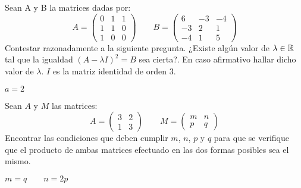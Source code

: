 \begin{ejer}
Sean A y B la matrices dadas por:
\[A=\begin{pmatrix}
0 & 1 & 1 \\
1 & 1 & 0 \\
1 & 0 & 0
\end{pmatrix}
\qquad
B=\begin{pmatrix}
6 & -3 & -4 \\
-3 & 2 & 1 \\
-4 & 1 & 5
\end{pmatrix} \]
Contestar razonadamente a la siguiente pregunta. ¿Existe algún valor de $\lambda \in \mathbb{R}$ tal que la igualdad $(A-\lambda I)^2=B$ sea cierta?. En caso afirmativo hallar dicho valor de $\lambda $. $I$ es la matriz identidad de orden 3. 
\begin{solu}
$a=2$
\end{solu}
\end{ejer}

\begin{ejer}
 Sean $A$ y $M$ las matrices:
\[ A=\begin{pmatrix}
3 & 2 \\
1 & 3
\end{pmatrix}
\qquad
M=\begin{pmatrix}
m & n \\
p & q
\end{pmatrix} \]
Encontrar las condiciones que deben cumplir $m$, $n$, $p$ y $q$ para que se verifique que el producto de ambas matrices efectuado en las dos formas posibles sea el mismo.
\begin{solu}
$ m= q \qquad n=2p$
\end{solu}
\end{ejer}

